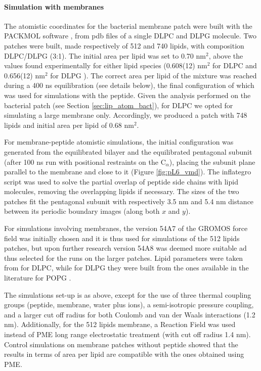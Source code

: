 \paragraph{Simulation with membranes} The atomistic coordinates for the bacterial membrane patch were built with the PACKMOL software \citep{Martinez2009}, from pdb files of a single DLPC \citep{PogerOrig} and DLPG \citep{Kukol2009} molecule. Two patches were built, made respectively of 512 and 740 lipids, with composition DLPC/DLPG (3:1). The initial area per lipid was set to 0.70 nm$^2$, above the values found experimentally for either lipid species (0.608(12) nm$^2$ for DLPC \citep{Kucerka2011} and 0.656(12) nm$^2$ for DLPG \citep{Pan2012}). The correct area per lipid of the mixture was reached during a 400 ns equilibration (see details below), the final configuration of which was used for simulations with the peptide.
Given the analysis performed on the bacterial patch (see Section \ref{sec:lip_atom_bact}), for DLPC we opted for simulating a large membrane only. Accordingly, we produced a patch with 748 lipids and initial area per lipid of 0.68 nm$^2$.

For membrane-peptide atomistic simulations, the initial configuration was generated from the equilibrated bilayer and the equilibrated pentagonal subunit (after 100 ns run with positional restraints on the C$_\alpha$), placing the subunit plane parallel to the membrane and close to it (Figure \ref{fig:pL6_vmd}).
%
The inflategro script \citep{Kandt2007} was used to solve the partial overlap of peptide side chains with lipid molecules, removing the overlapping lipids if necessary.
%
The sizes of the two patches fit the pentagonal subunit with respectively 3.5 nm and 5.4 nm distance between its periodic boundary images (along both $x$ and $y$).

For simulations involving membranes, the version 54A7 of the GROMOS force field \citep{Schmid2011} was initially chosen and it is thus used for simulations of the 512 lipids patches, but upon further research version 54A8 \citep{Oostenbrink2005, Reif2013} was deemed more suitable ad thus selected for the runs on the larger patches. Lipid parameters were taken from \citep{PogerOrig} for DLPC, while for DLPG they were built from the ones available in the literature for POPG \citep{Kukol2009}.

The simulations set-up is as above, except for the use of three thermal coupling groups (peptide, membrane, water plus ions), a semi-isotropic pressure coupling, and a larger cut off radius for both Coulomb and van der Waals interactions (1.2 nm). Additionally, for the 512 lipids membrane, a Reaction Field \citep{Tironi1995} was used instead of PME long range electrostatic treatment (with cut off radius 1.4 nm). Control simulations on membrane patches without peptide showed that the results in terms of area per lipid are compatible with the ones obtained using PME.

